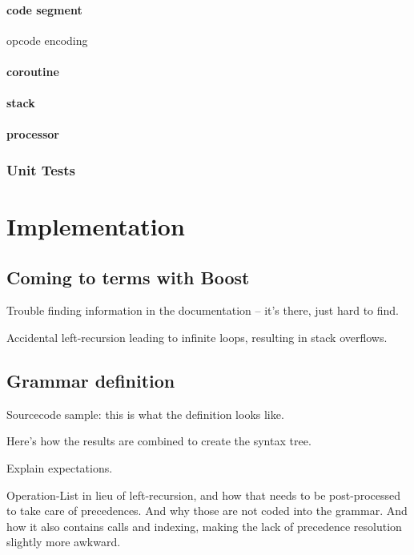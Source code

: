             \subsubsection{code segment}
                opcode encoding
            \subsubsection{coroutine}
            \subsubsection{stack}
            \subsubsection{processor}
        
        \subsection{Unit Tests}


\chapter{Implementation}

    
    \section{Coming to terms with Boost}
    
        Trouble finding information in the documentation -- it's there, just hard to find.
        
        Accidental left-recursion leading to infinite loops, resulting in stack overflows.
    
    \section{Grammar definition}
    
        Sourcecode sample: this is what the definition looks like.
        
        Here's how the results are combined to create the syntax tree.
        
        Explain expectations.
        
        Operation-List in lieu of left-recursion, and how that needs to be post-processed to take care of precedences. And why those are not coded into the grammar. And how it also contains calls and indexing, making the lack of precedence resolution slightly more awkward.
    
